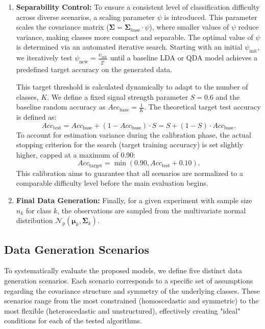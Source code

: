 \documentclass[a4paper,11pt,twoside]{report}
\theoremstyle{definition}
\begin{document}
\begin{enumerate}
    \item \textbf{Separability Control:}
    To ensure a consistent level of classification difficulty across diverse scenarios, a scaling parameter $\psi$ is introduced. This parameter scales the covariance matrix ($\boldsymbol{\Sigma} = \boldsymbol{\Sigma}_{\text{base}} \cdot \psi$), where smaller values of $\psi$ reduce variance, making classes more compact and separable. The optimal value of $\psi$ is determined via an automated iterative search. Starting with an initial $\psi_{\text{init}}$, we iteratively test $\psi_{\text{new}} =\frac{\psi_{\text{init}}}{2^i}$ until a baseline LDA or QDA model achieves a predefined target accuracy on the generated data.

    This target threshold is calculated dynamically to adapt to the number of classes, $K$. We define a fixed signal strength parameter $S = 0.6$ and the baseline random accuracy as $Acc_{\text{base}} =\frac{1}{K}$. The theoretical target test accuracy is defined as:
    \begin{equation}
        Acc_{\text{test}} = Acc_{\text{base}} + (1 - Acc_{\text{base}}) \cdot S = S + (1 - S) \cdot Acc_{\text{base}}.
    \end{equation}
    To account for estimation variance during the calibration phase, the actual stopping criterion for the search (target training accuracy) is set slightly higher, capped at a maximum of 0.90:
    \begin{equation}
        Acc_{\text{target}} = \min(0.90, Acc_{\text{test}} + 0.10).
    \end{equation}
    This calibration aims to guarantee that all scenarios are normalized to a comparable difficulty level before the main evaluation begins.

    \item \textbf{Final Data Generation:}
    Finally, for a given experiment with sample size $n_k$ for class $k$, the observations are sampled from the multivariate normal distribution $\mathcal{N}_p(\boldsymbol{\mu}_k, \boldsymbol{\Sigma}_k)$.
\end{enumerate}

\subsection{Data Generation Scenarios}
\label{sec:scenarios}

To systematically evaluate the proposed models, we define five distinct data generation scenarios. Each scenario corresponds to a specific set of assumptions regarding the covariance structure and symmetry of the underlying classes. These scenarios range from the most constrained (homoscedastic and symmetric) to the most flexible (heteroscedastic and unstructured), effectively creating "ideal" conditions for each of the tested algorithms.
\end{document}
